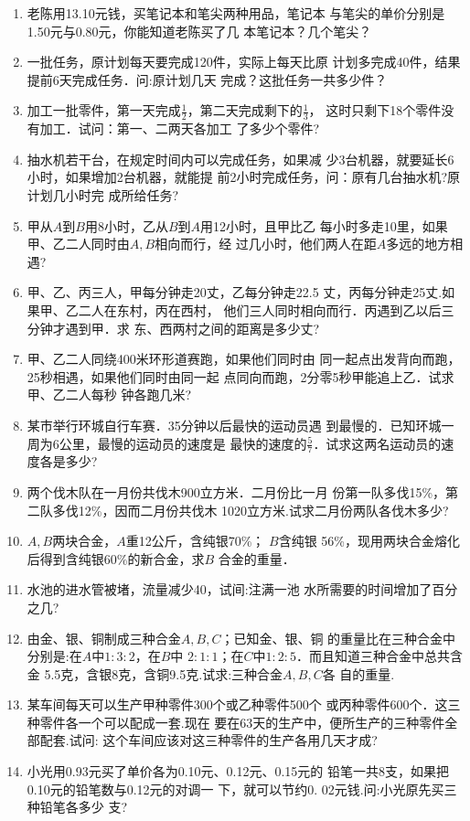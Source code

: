 \begin{enumerate}
\item  老陈用13.10元钱，买笔记本和笔尖两种用品，笔记本
与笔尖的单价分别是1.50元与0.80元，你能知道老陈买了几
本笔记本？几个笔尖？
\item  一批任务，原计划每天要完成120件，实际上每天比原
计划多完成40件，结果提前6天完成任务．问:原计划几天
完成？这批任务一共多少件？
\item  加工一批零件，第一天完成$\frac{1}{2}$，第二天完成剩下的$\frac{1}{3}$，
这时只剩下18个零件没有加工．试问：第一、二两天各加工
了多少个零件?
\item  抽水机若干台，在规定时间内可以完成任务，如果减
少3台机器，就要延长6小时，如果增加2台机器，就能提
前2小时完成任务，问：原有几台抽水机?原计划几小时完
成所给任务?
\item  甲从$A$到$B$用8小时，乙从$B$到$A$用12小时，且甲比乙
每小时多走10里，如果甲、乙二人同时由$A, B$相向而行，经
过几小时，他们两人在距$A$多远的地方相遇?
\item  甲、乙、丙三人，甲每分钟走20丈，乙每分钟走22.5
丈，丙每分钟走25丈.如果甲、乙二人在东村，丙在西村，
他们三人同时相向而行．丙遇到乙以后三分钟才遇到甲．求
东、西两村之间的距离是多少丈?
\item  甲、乙二人同绕400米环形道赛跑，如果他们同时由
同一起点出发背向而跑，25秒相遇，如果他们同时由同一起
点同向而跑，2分零5秒甲能追上乙．试求甲、乙二人每秒
钟各跑几米?
\item  某市举行环城自行车赛．35分钟以后最快的运动员遇
到最慢的．已知环城一周为6公里，最慢的运动员的速度是
最快的速度的$\frac{5}{7}$．试求这两名运动员的速度各是多少?
\item  两个伐木队在一月份共伐木900立方米．二月份比一月
份第一队多伐15\%，第二队多伐12\%，因而二月份共伐木
1020立方米.试求二月份两队各伐木多少?
\item $A, B$两块合金，$A$重12公斤，含纯银70\%； $B$含纯银
56\%，现用两块合金熔化后得到含纯银60\%的新合金，求$B$
合金的重量．
\item 水池的进水管被堵，流量减少40，试间:注满一池
水所需要的时间增加了百分之几?
\item 由金、银、铜制成三种合金$A, B,C$；已知金、银、铜
的重量比在三种合金中分别是:在$A$中$1:3:2$，在$B$中
$2:1:1$；在$C$中$1:2:5$．而且知道三种合金中总共含金
5.5克，含银8克，含铜9.5克.试求:三种合金$A, B,C$各
自的重量.
\item 某车间每天可以生产甲种零件300个或乙种零件500个
或丙种零件600个．这三种零件各一个可以配成一套.现在
要在63天的生产中，便所生产的三种零件全部配套.试问:
这个车间应该对这三种零件的生产各用几天才成?
\item 小光用0.93元买了单价各为0.10元、0.12元、0.15元的
铅笔一共8支，如果把0.10元的铅笔数与0.12元的对调一
下，就可以节约0. 02元钱.问:小光原先买三种铅笔各多少
支?


\end{enumerate}
